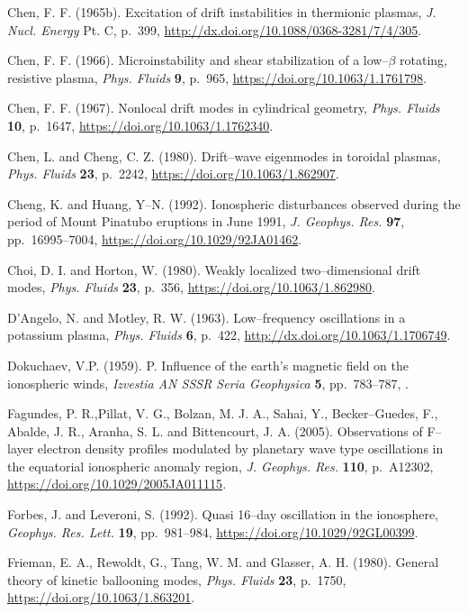 \documentclass[a4paper,openany,12pt]{report}
\begin{document}
\begin{thebibliography}{100}
\bibitem{}
Chen, F. F. (1965b). Excitation of drift instabilities in thermionic plasmas, \emph{J. Nucl. Energy} Pt. C, 
p.~399, \url{http://dx.doi.org/10.1088/0368-3281/7/4/305}.

\bibitem{}
Chen, F. F. (1966). Microinstability and shear stabilization of a low--$\beta$ rotating, resistive plasma, {\it Phys. Fluids} \textbf{9}, p.~965, \url{https://doi.org/10.1063/1.1761798}.

\bibitem{}
Chen, F. F. (1967). Nonlocal drift modes in cylindrical geometry, {\it Phys. Fluids} \textbf{10}, p.~1647, \url{https://doi.org/10.1063/1.1762340}.

\bibitem{}
Chen, L. and Cheng, C. Z. (1980). Drift--wave eigenmodes in toroidal plasmas, \emph{Phys. Fluids} \textbf{23}, p.~2242, \url{https://doi.org/10.1063/1.862907}.

\bibitem{}
Cheng, K.  and Huang, Y--N. (1992). Ionospheric disturbances observed during the period of Mount Pinatubo eruptions in June 1991, \emph{J. Geophys. Res.} \textbf{97}, pp.~16995--7004,
\url{https://doi.org/10.1029/92JA01462}.

\bibitem{}
Choi, D. I. and Horton, W. (1980). Weakly localized two--dimensional drift modes, \emph{Phys. Fluids} \textbf{23}, p.~356, \url{https://doi.org/10.1063/1.862980}.

\bibitem{}
D'Angelo, N. and Motley, R. W. (1963). Low--frequency oscillations in a potassium plasma, \emph{Phys. Fluids} 
\textbf{6}, p.~422, \url{http://dx.doi.org/10.1063/1.1706749}. 

\bibitem{}
Dokuchaev, V.P. (1959). P. Influence of the earth's magnetic field on the ionospheric winds, \emph{Izvestia  AN SSSR Seria Geophysica} \textbf{5}, pp.~783--787, \url{}.

\bibitem{}
 Fagundes, P. R.,Pillat, V. G., Bolzan, M. J. A., Sahai, Y., Becker--Guedes, F., Abalde, J. R., Aranha, S. L. and Bittencourt, J. A. (2005). Observations of F--layer electron density profiles modulated by planetary wave type oscillations in the equatorial ionospheric anomaly region, \emph{J. Geophys. Res.} \textbf{110}, p.~A12302, \url{https://doi.org/10.1029/2005JA011115}.

\bibitem{}
Forbes, J. and Leveroni, S. (1992). Quasi 16--day oscillation in the ionosphere, {\it Geophys. Res. Lett.} \textbf{19}, pp.~981--984, \url{https://doi.org/10.1029/92GL00399}.

\bibitem{}
Frieman, E. A., Rewoldt, G., Tang, W. M. and Glasser, A. H. (1980). General theory of kinetic ballooning modes, \emph{Phys. Fluids} \textbf{23}, p.~1750, \url{https://doi.org/10.1063/1.863201}.


\end{thebibliography}
\end{document}
